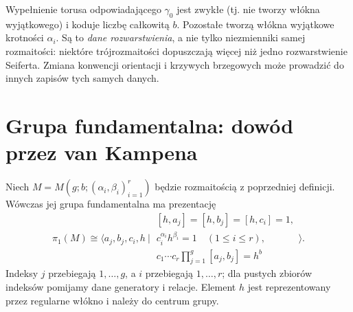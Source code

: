 Wypełnienie torusa odpowiadającego $\gamma_0$ jest zwykłe
(tj. nie tworzy włókna wyjątkowego) i koduje liczbę
całkowitą $b$. Pozostałe tworzą włókna wyjątkowe
krotności $\alpha_i$. Są to \emph{dane rozwarstwienia},
a nie tylko niezmienniki samej rozmaitości: niektóre
trójrozmaitości dopuszczają więcej niż jedno rozwarstwienie
Seiferta. Zmiana konwencji orientacji i krzywych brzegowych
może prowadzić do innych zapisów tych samych danych.

\begin{center}
\end{center}

\section{Grupa fundamentalna: dowód przez van Kampena}
\label{sec:tg-seifert-pi1}

\begin{twierdzenie}
\label{thm:tg-seifert-presentation}
Niech $M=M(g;b;(\alpha_i,\beta_i)_{i=1}^r)$ będzie
rozmaitością z poprzedniej definicji. Wówczas jej grupa
fundamentalna ma prezentację
\[
\pi_1(M)\cong\Big\langle a_j,b_j,c_i,h\ \Big|\
\begin{array}{l}
[h,a_j]=[h,b_j]=[h,c_i]=1,\\
c_i^{\alpha_i}h^{\beta_i}=1\quad (1\leq i\leq r),\\
c_1\cdots c_r\prod_{j=1}^g[a_j,b_j]=h^b
\end{array}\Big\rangle.
\]
Indeksy $j$ przebiegają $1,\ldots,g$, a $i$ przebiegają
$1,\ldots,r$; dla pustych zbiorów indeksów pomijamy
dane generatory i relacje. Element $h$ jest reprezentowany
przez regularne włókno i należy do centrum grupy.
\end{twierdzenie}

